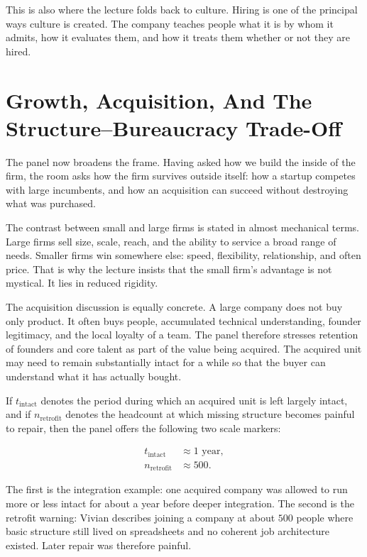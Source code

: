 This is also where the lecture folds back to culture. Hiring is one of the principal ways culture is created. The company teaches people what it is by whom it admits, how it evaluates them, and how it treats them whether or not they are hired.

\section{Growth, Acquisition, And The Structure--Bureaucracy Trade-Off}

The panel now broadens the frame. Having asked how we build the inside of the firm, the room asks how the firm survives outside itself: how a startup competes with large incumbents, and how an acquisition can succeed without destroying what was purchased.

The contrast between small and large firms is stated in almost mechanical terms. Large firms sell size, scale, reach, and the ability to service a broad range of needs. Smaller firms win somewhere else: speed, flexibility, relationship, and often price. That is why the lecture insists that the small firm's advantage is not mystical. It lies in reduced rigidity.

The acquisition discussion is equally concrete. A large company does not buy only product. It often buys people, accumulated technical understanding, founder legitimacy, and the local loyalty of a team. The panel therefore stresses retention of founders and core talent as part of the value being acquired. The acquired unit may need to remain substantially intact for a while so that the buyer can understand what it has actually bought.

If \(t_{\mathrm{intact}}\) denotes the period during which an acquired unit is left largely intact, and if \(n_{\mathrm{retrofit}}\) denotes the headcount at which missing structure becomes painful to repair, then the panel offers the following two scale markers:

\begin{align}
t_{\mathrm{intact}} &\approx 1\text{ year},\\
n_{\mathrm{retrofit}} &\approx 500.
\end{align}

The first is the integration example: one acquired company was allowed to run more or less intact for about a year before deeper integration. The second is the retrofit warning: Vivian describes joining a company at about \(500\) people where basic structure still lived on spreadsheets and no coherent job architecture existed. Later repair was therefore painful.

